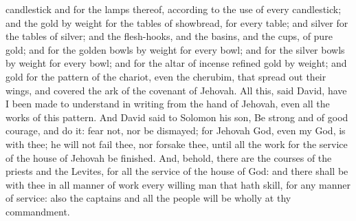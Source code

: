 candlestick and for the lamps thereof, according to the use of every candlestick; and the gold by weight for the tables of showbread, for every table; and silver for the tables of silver; and the flesh-hooks, and the basins, and the cups, of pure gold; and for the golden bowls by weight for every bowl; and for the silver bowls by weight for every bowl; and for the altar of incense refined gold by weight; and gold for the pattern of the chariot, even the cherubim, that spread out their wings, and covered the ark of the covenant of Jehovah. All this, said David, have I been made to understand in writing from the hand of Jehovah, even all the works of this pattern.  And David said to Solomon his son, Be strong and of good courage, and do it: fear not, nor be dismayed; for Jehovah God, even my God, is with thee; he will not fail thee, nor forsake thee, until all the work for the service of the house of Jehovah be finished. And, behold, there are the courses of the priests and the Levites, for all the service of the house of God: and there shall be with thee in all manner of work every willing man that hath skill, for any manner of service: also the captains and all the people will be wholly at thy commandment. 

